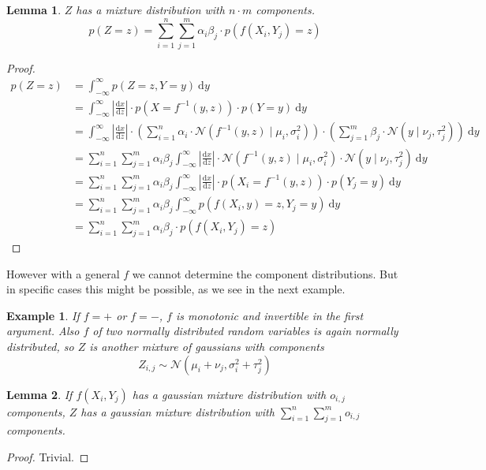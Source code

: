 \documentclass[11pt]{article}
\newtheorem{lemma}{Lemma}
\newtheorem{example}{Example}
\begin{document}
\begin{lemma}
  $Z$ has a mixture distribution with $n \cdot m$ components.
  \begin{equation*}
    p(Z = z) = \sum_{i = 1}^{n} \sum_{j = 1}^{m} \alpha_{i}\beta_{j} \cdot p(f(X_{i}, Y_{j}) = z)
  \end{equation*}
\end{lemma}
\begin{proof}
  \begin{align*}
    p(Z = z) & = \int_{-\infty}^{\infty} p(Z = z, Y = y)~\mathrm{d}y\\
             & = \int_{-\infty}^{\infty} \left| \frac{\mathrm{d}x}{\mathrm{d}z} \right| \cdot p(X = f^{-1}(y, z)) \cdot p(Y = y)~\mathrm{d}y\\
             & = \int_{-\infty}^{\infty} \left| \frac{\mathrm{d}x}{\mathrm{d}z} \right| \cdot \left( \sum_{i = 1}^{n} \alpha_{i} \cdot \mathcal{N}(f^{-1}(y, z) \mid \mu_{i}, \sigma_{i}^{2}) \right) \cdot \left( \sum_{j = 1}^{m} \beta_{j} \cdot \mathcal{N}(y \mid \nu_{j}, \tau_{j}^{2}) \right)~\mathrm{d}y\\
             & = \sum_{i = 1}^{n} \sum_{j = 1}^{m} \alpha_{i}\beta_{j} \int_{-\infty}^{\infty} \left| \frac{\mathrm{d}x}{\mathrm{d}z} \right| \cdot \mathcal{N}(f^{-1}(y, z) \mid \mu_{i}, \sigma_{i}^{2}) \cdot \mathcal{N}(y \mid \nu_{j}, \tau_{j}^{2})~\mathrm{d}y\\
             & = \sum_{i = 1}^{n} \sum_{j = 1}^{m} \alpha_{i}\beta_{j} \int_{-\infty}^{\infty} \left| \frac{\mathrm{d}x}{\mathrm{d}z} \right| \cdot p(X_{i} = f^{-1}(y, z)) \cdot p(Y_{j} = y)~\mathrm{d}y\\
             & = \sum_{i = 1}^{n} \sum_{j = 1}^{m} \alpha_{i}\beta_{j} \int_{-\infty}^{\infty} p(f(X_{i}, y) = z, Y_{j} = y)~\mathrm{d}y\\
             & = \sum_{i = 1}^{n} \sum_{j = 1}^{m} \alpha_{i}\beta_{j} \cdot p(f(X_{i}, Y_{j}) = z)
  \end{align*}
\end{proof}

However with a general $f$ we cannot determine the component distributions. But
in specific cases this might be possible, as we see in the next example.

\begin{example}
  If $f = +$ or $f = -$, $f$ is monotonic and invertible in the first
  argument. Also $f$ of two normally distributed random variables is again
  normally distributed, so $Z$ is another mixture of gaussians with components
  \begin{equation*}
    Z_{i,j} \sim \mathcal{N}(\mu_{i} + \nu_{j}, \sigma_{i}^{2} + \tau_{j}^{2})
  \end{equation*}
\end{example}

\begin{lemma}
  If $f(X_{i}, Y_{j})$ has a gaussian mixture distribution with $o_{i,j}$
  components, $Z$ has a gaussian mixture distribution with
  $\sum_{i = 1}^{n} \sum_{j = 1}^{m} o_{i,j}$ components.
\end{lemma}

\begin{proof}
  Trivial.
\end{proof}
\end{document}
